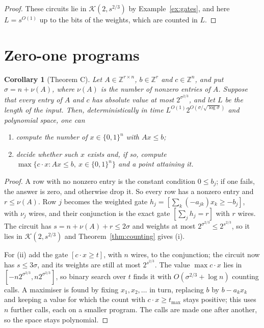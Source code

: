 \documentclass[11pt,reqno]{amsart}
\numberwithin{equation}{section}
\theoremstyle{plain}
\newtheorem{corollary}[theorem]{Corollary}
\theoremstyle{definition}
\theoremstyle{remark}
\newcommand{\Z}{\mathbb{Z}}
\newcommand{\cK}{\mathcal{K}}
\begin{document}
\begin{proof}
These circuits lie in $\cK(2,s^{2/3})$ by Example~\ref{ex:gates}, and here
$L=s^{O(1)}$ up to the bits of the weights, which are counted in $L$.
\end{proof}

\section{Zero-one programs}\label{sec:ilp}

\begin{corollary}[Theorem C]\label{cor:ilp}
Let $A\in\Z^{r\times n}$, $b\in\Z^r$ and $c\in\Z^n$, and put $\sigma=n+\nu(A)$,
where $\nu(A)$ is the number of nonzero entries of $A$. Suppose that every
entry of $A$ and $c$ has absolute value at most $2^{\sigma^{2/3}}$, and let $L$ be
the length of the input. Then, deterministically in time
$L^{O(1)}2^{O(\sigma/\sqrt{\log\sigma})}$ and polynomial space, one can
\begin{enumerate}[label=\textup{(\roman*)},leftmargin=2.2em]
\item compute the number of $x\in\{0,1\}^n$ with $Ax\le b$;
\item decide whether such $x$ exists and, if so, compute $\max\{c\cdot x:Ax\le
b,\ x\in\{0,1\}^n\}$ and a point attaining it.
\end{enumerate}
\end{corollary}

\begin{proof}
A row with no nonzero entry is the constant condition $0\le b_j$; if one fails,
the answer is zero, and otherwise drop it. So every row has a nonzero entry and
$r\le\nu(A)$. Row $j$ becomes the weighted gate
$h_j=[\sum_k(-a_{jk})x_k\ge-b_j]$, with $\nu_j$ wires, and their conjunction is the
exact gate $[\sum_jh_j=r]$ with $r$ wires. The circuit has $s=n+\nu(A)+r\le2\sigma$
and weights at most $2^{\sigma^{2/3}}\le2^{s^{2/3}}$, so it lies in
$\cK(2,s^{2/3})$ and Theorem~\ref{thm:counting} gives (i).

For (ii) add the gate $[c\cdot x\ge t]$, with $n$ wires, to the conjunction; the
circuit now has $s\le3\sigma$, and its weights are still at most
$2^{s^{2/3}}$. The value $\max c\cdot x$ lies in $[-n2^{\sigma^{2/3}},
n2^{\sigma^{2/3}}]$, so binary search over $t$ finds it with
$O(\sigma^{2/3}+\log n)$ counting calls. A maximiser is found by fixing
$x_1,x_2,\dots$ in turn, replacing $b$ by $b-a_kx_k$ and keeping a value for which
the count with $c\cdot x\ge t_{\max}$ stays positive; this uses $n$ further calls,
each on a smaller program. The calls are made one after another, so the space
stays polynomial.
\end{proof}
\end{document}
